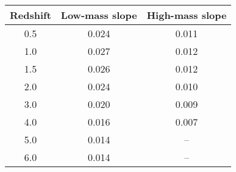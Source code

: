 \begin{table}[]
\centering
\begin{tabular}{c|c|c}
\hline \hline
Redshift & Low-mass slope & High-mass slope\\\hline
0.5 & 0.024 & 0.011 \\
1.0 & 0.027 & 0.012 \\
1.5 & 0.026 & 0.012 \\
2.0 & 0.024 & 0.010 \\
3.0 & 0.020 & 0.009 \\
4.0 & 0.016 & 0.007 \\
5.0 & 0.014 & -- \\
6.0 & 0.014 & -- \\
 \hline \hline
\end{tabular}
\caption{}
\label{tab:slopes}
\end{table}